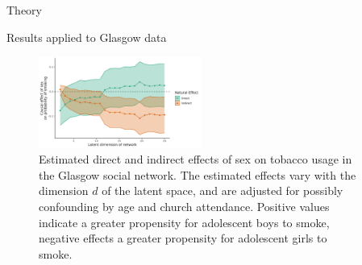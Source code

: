 \documentclass[final]{beamer}
\newlength{\sepwidth}
\newlength{\colwidth}
\newcommand{\separatorcolumn}{\begin{column}{\sepwidth}\end{column}}
\begin{document}
\begin{frame}[t]
\begin{columns}[t]
\begin{column}{\colwidth}
\begin{exampleblock}{Theory}

  \end{exampleblock}

  \begin{block}{Results applied to Glasgow data}

    \begin{figure}[ht!]
      \centering
      \includegraphics[width=0.5\textwidth]{figures/glasgow/effects.png}
      \caption{Estimated direct and indirect effects of sex on tobacco usage in the Glasgow social network. The estimated effects vary with the dimension $d$ of the latent space, and are adjusted for possibly confounding by age and church attendance. Positive values indicate a greater propensity for adolescent boys to smoke, negative effects a greater propensity for adolescent girls to smoke.}
      \label{fig:glasgow-estimates}
  \end{figure}

  \end{block}





\end{column}

\separatorcolumn
\end{columns}
\end{frame}
\end{document}
